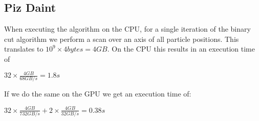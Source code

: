 \documentclass[]{article}
\begin{document}
\subsection{Piz Daint} 
When executing the algorithm on the CPU, for a single iteration of the binary cut algorithm we perform a scan over an axis of all particle positions. This translates to $10^9 \times 4 bytes = 4 GB$.
On the CPU this results in an execution time of 
\begin{center}
	$32 \times \frac{ 4 GB}{68 GB/s} = 1.8 s$ 
\end{center}

If we do the same on the GPU we get an execution time of:
\begin{center}
	$32 \times \frac{4 GB}{732 GB/s} + 2 \times \frac{4 GB}{32 GB/s} = 0.38 s$ 
\end{center}





\end{document}
